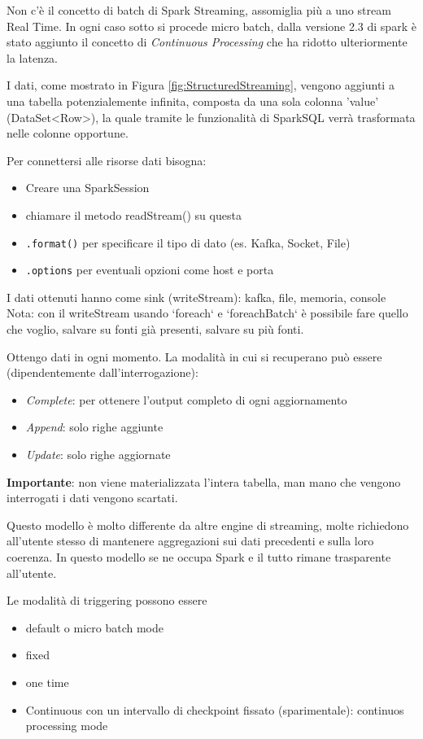 \documentclass[12pt,italian]{article}
\begin{document}
Non c'è il concetto di batch di Spark Streaming, assomiglia più a uno stream Real Time.
In ogni caso sotto si procede micro batch, dalla versione 2.3 di spark è stato aggiunto il concetto di \textit{Continuous Processing} che ha ridotto ulteriormente la latenza.

I dati, come mostrato in Figura \ref{fig:StructuredStreaming}, vengono aggiunti a una tabella potenzialemente infinita, composta da una sola colonna 'value' (DataSet<Row>), 
la quale tramite le funzionalità di SparkSQL verrà trasformata nelle colonne opportune.

Per connettersi alle risorse dati bisogna:
\begin{itemize}
	\item Creare una SparkSession
	\item chiamare il metodo readStream() su questa
	\item \texttt{.format()} per specificare il tipo di dato (es. Kafka, Socket, File)
	\item \texttt{.options} per eventuali opzioni come host e porta
\end{itemize}

I dati ottenuti hanno come sink (writeStream): kafka, file, memoria, console
Nota: con il writeStream usando `foreach` e `foreachBatch` è possibile fare quello che voglio, salvare su fonti già presenti, salvare su più fonti.

Ottengo dati in ogni momento.
La modalità in cui si recuperano può essere (dipendentemente dall'interrogazione): 
\begin{itemize}
	\item \textit{Complete}: per ottenere l'output completo di ogni aggiornamento
	\item \textit{Append}: solo righe aggiunte
	\item \textit{Update}: solo righe aggiornate
\end{itemize}

\textbf{Importante}: non viene materializzata l'intera tabella, man mano che vengono interrogati i dati vengono scartati. 

Questo modello è molto differente da altre engine di streaming, molte richiedono all'utente stesso di mantenere aggregazioni sui dati precedenti e sulla loro coerenza.
In questo modello se ne occupa Spark e il tutto rimane trasparente all'utente.

Le modalità di triggering possono essere
\begin{itemize}
	\item default o micro batch mode
	\item fixed
	\item one time
	\item Continuous con un intervallo di checkpoint fissato (sparimentale): continuos processing mode
\end{itemize}
\end{document}
